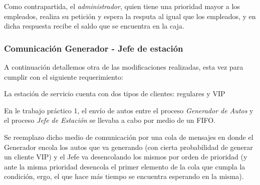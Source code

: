 \documentclass[12pt,a4paper,spanish]{article}
\begin{document}
	Como contrapartida, el \emph{administrador}, quien tiene una prioridad mayor a los empleados, realiza su
	petición y espera la resputa al igual que los empleados, y en dicha respuesta recibe el saldo que se 
	encuentra en la caja.

	\subsubsection{Comunicación Generador - Jefe de estación}

	A continuación detallemos otra de las modificaciones realizadas, esta vez para cumplir con el siguiente requerimiento:
	
	\begin{framed}
	La estación de servicio cuenta con dos tipos de clientes: regulares y VIP
	\end{framed}

	En le trabajo práctico 1, el envío de autos entre el proceso \emph{Generador de Autos} y el proceso \emph{Jefe de Estación}
	se llevaba a cabo por medio de un FIFO. 

	Se reemplazo dicho medio de comunicación por una cola de mensajes en donde el Generador encola los autos que va generando 
	(con cierta probabilidad de generar un cliente VIP) y el Jefe va desencolando los mismos por orden de prioridad (y ante la misma prioridad desencola el primer elemento de la cola que cumpla la condición, ergo, el que hace más tiempo se encuentra 
	esperando en la misma).
\end{document}
